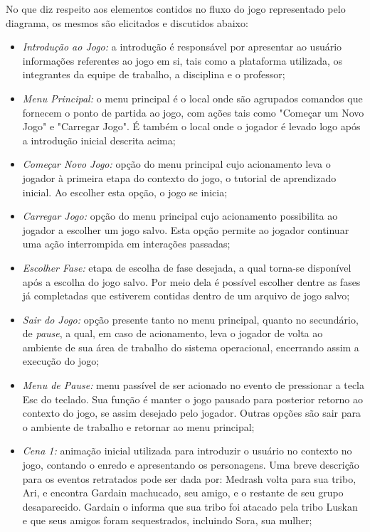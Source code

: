 No que diz respeito aos elementos contidos no fluxo do jogo representado pelo diagrama, os mesmos são elicitados e discutidos abaixo:
\begin{itemize}
\item \textit{Introdução ao Jogo:} a introdução é responsável por apresentar ao usuário informações referentes ao jogo em si, tais como a plataforma utilizada, os integrantes da equipe de trabalho, a disciplina e o professor;
\item \textit{Menu Principal:} o menu principal é o local onde são agrupados comandos que fornecem o ponto de partida ao jogo, com ações tais como "Começar um Novo Jogo" e "Carregar Jogo". É também o local onde o jogador é levado logo após a introdução inicial descrita acima;
\item \textit{Começar Novo Jogo:} opção do menu principal cujo acionamento leva o jogador à primeira etapa do contexto do jogo, o tutorial de aprendizado inicial. Ao escolher esta opção, o jogo se inicia;
\item \textit{Carregar Jogo:} opção do menu principal cujo acionamento possibilita ao jogador a escolher um jogo salvo. Esta opção permite ao jogador continuar uma ação interrompida em interações passadas;
\item \textit{Escolher Fase:} etapa de escolha de fase desejada, a qual torna-se disponível após a escolha do jogo salvo. Por meio dela é possível escolher dentre as fases já completadas que estiverem contidas dentro de um arquivo de jogo salvo;
\item \textit{Sair do Jogo:} opção presente tanto no menu principal, quanto no secundário, de \textit{pause}, a qual, em caso de acionamento, leva o jogador de volta ao ambiente de sua área de trabalho do sistema operacional, encerrando assim a execução do jogo;
\item \textit{Menu de Pause:} menu passível de ser acionado no evento de pressionar a tecla Esc do teclado. Sua função é manter o jogo pausado para posterior retorno ao contexto do jogo, se assim desejado pelo jogador. Outras opções são sair para o ambiente de trabalho e retornar ao menu principal;
\item \textit{Cena 1:} animação inicial utilizada para introduzir o usuário no contexto no jogo, contando o enredo e apresentando os personagens. Uma breve descrição para os eventos retratados pode ser dada por: Medrash volta para sua tribo, Ari, e encontra Gardain machucado, seu amigo, e o restante de seu grupo desaparecido. Gardain o informa que sua tribo foi atacado pela tribo Luskan e que seus amigos foram sequestrados, incluindo Sora, sua mulher;

\end{itemize}

